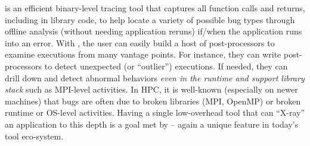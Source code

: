 \parlot is an efficient binary-level tracing tool that captures all function calls and returns, including in library code, 
to help locate a variety of possible bug types through 
offline analysis (without needing application reruns) 
if/when the application runs into an error. 
%
With \parlot, the user can easily build a host of post-processors to examine
executions from many vantage points.
%
For instance, they can write post-processors
to detect unexpected (or ``outlier'') executions.
%
If needed, they can 
drill down and detect abnormal behaviors {\em even in the runtime and
support library stack} such as MPI-level activities.
%
In HPC, it is well-known (especially on newer machines) that bugs are often due to
broken libraries (MPI, OpenMP) or broken runtime or OS-level activities.
%
Having a single low-overhead tool that can ``X-ray'' an application to this depth is a goal met by \parlot -- again a unique feature in today's tool eco-system.

